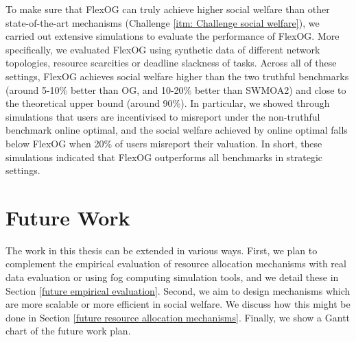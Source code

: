 \documentclass[11pt]{phdthesis}
\begin{document}
To make sure that FlexOG can truly achieve higher social welfare than other state-of-the-art mechanisms (Challenge \ref{itm: Challenge social welfare}), we carried out extensive simulations to evaluate the performance of FlexOG. More specifically, we evaluated FlexOG using synthetic data of different network topologies, resource scarcities or deadline slackness of tasks. Across all of these settings, FlexOG achieves social welfare higher than the two truthful benchmarks (around 5-10\% better than OG, and 10-20\% better than SWMOA2) and close to the theoretical upper bound (around 90\%). In particular, we showed through simulations that users are incentivised to misreport under the non-truthful benchmark online optimal, and the social welfare achieved by online optimal falls below FlexOG when 20\% of users misreport their valuation. In short, these simulations indicated that FlexOG outperforms all benchmarks in strategic settings. 


%
%


\section{Future Work} \label{future work}

The work in this thesis can be extended in various ways. First, we plan to complement the empirical evaluation of resource allocation mechanisms with real data evaluation or using fog computing simulation tools, and we detail these in Section \ref{future empirical evaluation}. Second, we aim to design mechanisms which are more scalable or more efficient in social welfare. We discuss how this might be done in Section \ref{future resource allocation mechanisms}. Finally, we show a Gantt chart of the future work plan.
\end{document}
